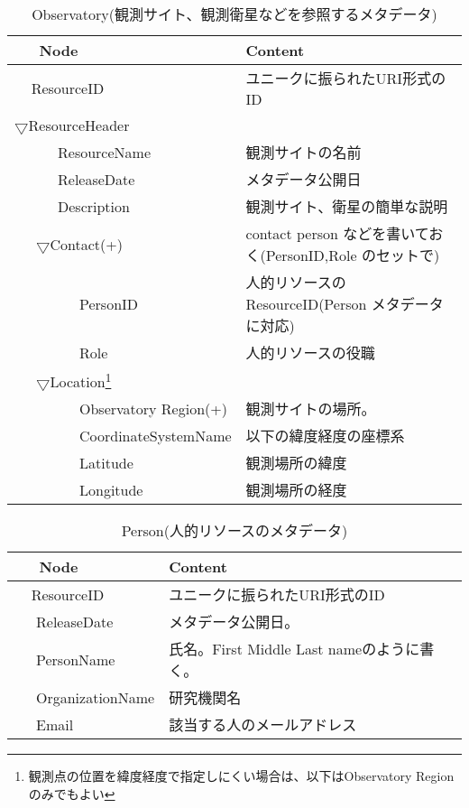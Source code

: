 \begin{table}[ht]
\begin{center}
{\scriptsize
\caption{Observatory(観測サイト、観測衛星などを参照するメタデータ)}
\begin{tabular}{ll}\hline
\ \ \ Node & Content \\ \hline
\ \ \,ResourceID & ユニークに振られたURI形式のID\\
$\bigtriangledown$ResourceHeader & \\
\ \ \ \ \ \ ResourceName & 観測サイトの名前\\
\ \ \ \ \ \ ReleaseDate & メタデータ公開日\\
\ \ \ \ \ \ Description & 観測サイト、衛星の簡単な説明\\
\ \ \ $\bigtriangledown$Contact(+) & contact person などを書いておく(PersonID,Role のセットで)\\
\ \ \ \ \ \ \ \ \ PersonID & 人的リソースのResourceID(Person メタデータに対応)\\
\ \ \ \ \ \ \ \ \ Role & 人的リソースの役職\\
\ \ \ $\bigtriangledown$Location\footnote{観測点の位置を緯度経度で指定しにくい場合は、以下はObservatory Region のみでもよい}\\
\ \ \ \ \ \ \ \ \ Observatory Region(+) & 観測サイトの場所。\\
\ \ \ \ \ \ \ \ \ CoordinateSystemName & 以下の緯度経度の座標系\\
\ \ \ \ \ \ \ \ \ Latitude & 観測場所の緯度\\
\ \ \ \ \ \ \ \ \ Longitude & 観測場所の経度\\ \hline
\end{tabular}
}
\end{center}
\end{table}

\begin{table}[ht]
\begin{center}
{\scriptsize
\caption{Person(人的リソースのメタデータ)}
\begin{tabular}{ll}\hline
\ \ \ Node & Content \\ \hline
\ \ \,ResourceID & ユニークに振られたURI形式のID\\
\ \ \ ReleaseDate & メタデータ公開日。\\
\ \ \ PersonName & 氏名。First Middle Last nameのように書く。\\
\ \ \ OrganizationName & 研究機関名\\
\ \ \ Email & 該当する人のメールアドレス\\ \hline
\end{tabular}
}
\end{center}
\end{table}

